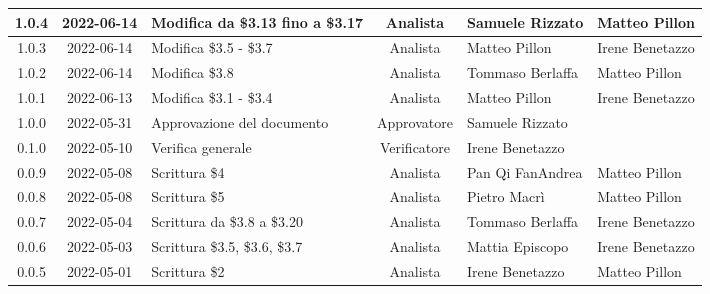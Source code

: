\begin{center}
\begin{longtable}{ |c|c|p{8em}|c|m{5em}|m{5em}| }
	\hline
	1.0.4 & 2022-06-14 & Modifica da \$3.13 \newline fino a \$3.17 & Analista & Samuele	\newline Rizzato & Matteo \newline Pillon\\
	\hline
	1.0.3 & 2022-06-14 & Modifica \newline \$3.5 - \$3.7 & Analista & Matteo	\newline Pillon & Irene \newline Benetazzo\\
  	\hline
	1.0.2 & 2022-06-14 & Modifica \newline \$3.8 & Analista & Tommaso	\newline Berlaffa & Matteo \newline Pillon\\
  	\hline
	1.0.1 & 2022-06-13 & Modifica \newline \$3.1 - \$3.4 & Analista & Matteo	\newline Pillon & Irene \newline Benetazzo\\
	\hline
	1.0.0 & 2022-05-31 & Approvazione del documento & Approvatore & Samuele \newline Rizzato & \\
	\hline
	0.1.0 & 2022-05-10 & Verifica generale & Verificatore & Irene \newline Benetazzo & \\
	\hline
    0.0.9 & 2022-05-08 & Scrittura \$4 & Analista & Pan Qi Fan\newline Andrea & Matteo \newline Pillon\\
	\hline
    0.0.8 & 2022-05-08 & Scrittura \$5 & Analista & Pietro \newline Macrì & Matteo \newline Pillon\\
	\hline
    0.0.7 & 2022-05-04 & Scrittura \newline da \$3.8 a \$3.20 & Analista & Tommaso \newline Berlaffa & Irene \newline Benetazzo\\
    \hline
    0.0.6 & 2022-05-03 & Scrittura \newline \$3.5, \$3.6, \$3.7 & Analista & Mattia \newline Episcopo & Irene \newline Benetazzo\\
	\hline
    0.0.5 & 2022-05-01 & Scrittura \$2 & Analista & Irene \newline Benetazzo & Matteo \newline Pillon\\

\end{longtable}
\end{center}
